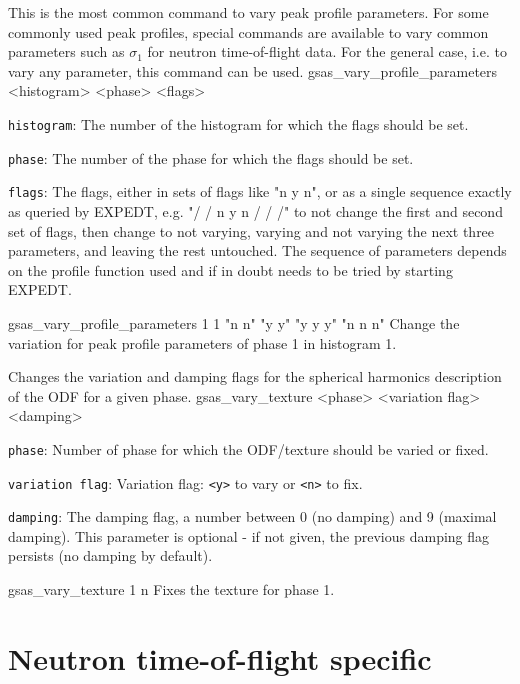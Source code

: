 {
This is the most common command to vary peak profile parameters. For some commonly used peak profiles, special commands are available to vary common parameters such as $\sigma_1$ for neutron time-of-flight data. For the general case, i.e. to vary any parameter, this command can be used.
}{
gsas\_vary\_profile\_parameters <histogram> <phase> <flags>
}{
\item \texttt{histogram}: The number of the histogram for which the flags should be set.
\item \texttt{phase}: The number of the phase for which the flags should be set.
\item \texttt{flags}: The flags, either in sets of flags like "n y n", or as a single sequence exactly as queried by EXPEDT, e.g. "/ / n y n / / /" to not change the first and second set of flags, then change to not varying, varying and not varying the next three parameters, and leaving the rest untouched. The sequence of parameters depends on the profile function used and if in doubt needs to be tried by starting EXPEDT.
}{
gsas\_vary\_profile\_parameters 1 1 "n n" "y y" "y y y" "n n n"
}{
Change the variation for peak profile parameters of phase 1 in histogram 1.
}


{
Changes the variation and damping flags for the spherical harmonics description of the ODF for a given phase.
}{
gsas\_vary\_texture <phase> <variation flag> <damping>
}{
\item \texttt{phase}:  Number of phase for which the ODF/texture should be varied or fixed. 
\item \texttt{variation flag}: Variation flag: \texttt{<y>} to vary or \texttt{<n>} to fix.  
\item \texttt{damping}: The damping flag, a number between 0 (no damping) and 9 (maximal damping). This parameter is optional - if not given, the previous damping flag persists (no damping by default).
}{
gsas\_vary\_texture 1 n
}{
Fixes the texture for phase 1.
}

\section{Neutron time-of-flight specific}

